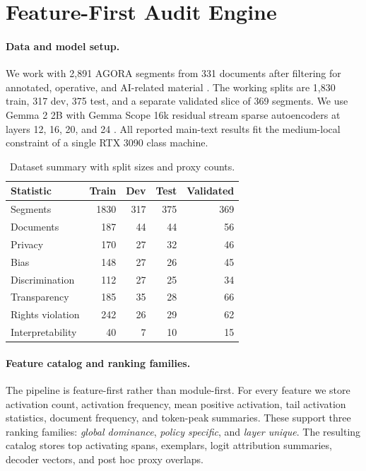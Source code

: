 \documentclass{article}
\begin{document}
\section{Feature-First Audit Engine}

\paragraph{Data and model setup.}
We work with 2,891 AGORA segments from 331 documents after filtering for annotated, operative, and AI-related material \cite{arnold2024agora}. The working splits are 1,830 train, 317 dev, 375 test, and a separate validated slice of 369 segments. We use Gemma 2 2B with Gemma Scope 16k residual stream sparse autoencoders at layers 12, 16, 20, and 24 \cite{gemma2024, lieberum2024gemmascope}. All reported main-text results fit the medium-local constraint of a single RTX 3090 class machine.

\begin{table}[t]
    \centering
    \caption{Dataset summary with split sizes and proxy counts.}
    \label{tab:dataset-summary}
    \scriptsize
    \begin{tabular}{lrrrr}
        \toprule
        Statistic & Train & Dev & Test & Validated \\
        \midrule
        Segments & 1830 & 317 & 375 & 369 \\
        Documents & 187 & 44 & 44 & 56 \\
        Privacy & 170 & 27 & 32 & 46 \\
        Bias & 148 & 27 & 26 & 45 \\
        Discrimination & 112 & 27 & 25 & 34 \\
        Transparency & 185 & 35 & 28 & 66 \\
        Rights violation & 242 & 26 & 29 & 62 \\
        Interpretability & 40 & 7 & 10 & 15 \\
        \bottomrule
    \end{tabular}
\end{table}

\paragraph{Feature catalog and ranking families.}
The pipeline is feature-first rather than module-first. For every feature we store activation count, activation frequency, mean positive activation, tail activation statistics, document frequency, and token-peak summaries. These support three ranking families: \emph{global dominance}, \emph{policy specific}, and \emph{layer unique}. The resulting catalog stores top activating spans, exemplars, logit attribution summaries, decoder vectors, and post hoc proxy overlaps.
\end{document}
